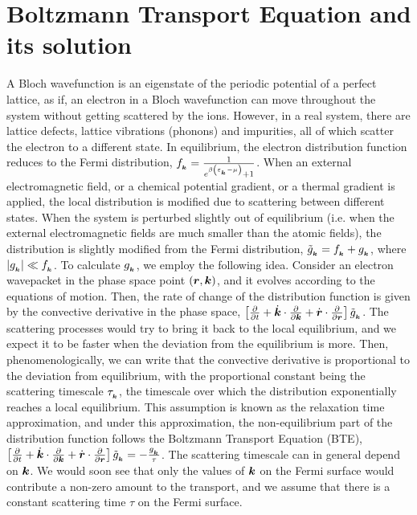 \documentclass{report}
\renewcommand\vec[1]{\ensuremath\boldsymbol{#1}} %
\begin{document}
\chapter{Boltzmann Transport Equation and its solution}\label{sec:BTE-and-solution}
A Bloch wavefunction is an eigenstate of the periodic potential of a perfect lattice, as if, an electron in a Bloch wavefunction can move throughout the system without getting scattered by the ions. However, in a real system, there are lattice defects, lattice vibrations (phonons) and impurities, all of which scatter the electron to a different state. In equilibrium, the electron distribution function reduces to the Fermi distribution, $f_{_{\vec{k}}} = \frac{1}{e^{\beta \left(\varepsilon_{_{\vec{k}}} - \mu \right)} + 1}$. When an external electromagnetic field, or a chemical potential gradient, or a thermal gradient is applied, the local distribution is modified due to scattering between different states. When the system is perturbed slightly out of equilibrium (i.e. when the external electromagnetic fields are much smaller than the atomic fields), the distribution is slightly modified from the Fermi distribution, $\tilde{g}_{_{\vec{k}}} = f_{_{\vec{k}}} + g_{_{\vec{k}}}$, where $|g_{_{\vec{k}}}| \ll f_{_{\vec{k}}}$. To calculate $g_{_{\vec{k}}}$, we employ the following idea. Consider an electron wavepacket in the phase space point $(\vec{r},\vec{k})$, and it evolves according to the equations of motion. Then, the rate of change of the distribution function is given by the convective derivative in the phase space, $\left[\frac{\partial}{\partial t} +  \dot{\vec{k}}\cdot\frac{\partial}{\partial \vec{k}} + \dot{\vec{r}}\cdot\frac{\partial}{\partial \vec{r}} \right]\tilde{g}_{_{\vec{k}}}$. The scattering processes would try to bring it back to the local equilibrium, and we expect it to be faster when the deviation from the equilibrium is more. Then, phenomenologically, we can write that the convective derivative is proportional to the deviation from equilibrium, with the proportional constant being the scattering timescale $\tau_{_{\vec{k}}}$, the timescale over which the distribution exponentially reaches a local equilibrium. This assumption is known as the relaxation time approximation, and under this approximation, the non-equilibrium part of the distribution function follows the Boltzmann Transport Equation (BTE), $\left[\frac{\partial}{\partial t} +  \dot{\vec{k}}\cdot\frac{\partial}{\partial \vec{k}} + \dot{\vec{r}}\cdot\frac{\partial}{\partial \vec{r}} \right]\tilde{g}_{_{\vec{k}}} = -\frac{g_{_{\vec{k}}}}{\tau}$. The scattering timescale can in general depend on $\vec{k}$. We would soon see that only the values of $\vec{k}$ on the Fermi surface would contribute a non-zero amount to the transport, and we assume that there is a constant scattering time $\tau$ on the Fermi surface. 
\end{document}
